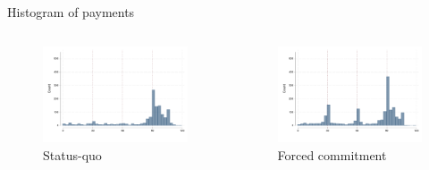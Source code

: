 \documentclass[8pt]{beamer}
\begin{document}
\begin{frame}{Histogram of payments}

\begin{columns}
\begin{column}{.33\textwidth}
    \begin{figure}[H]
    \caption{Status-quo}
    \begin{center}
        \includegraphics[width=\textwidth]{Figuras/hist_payments_sq.pdf}
    \end{center}
\end{figure}
\end{column}

\begin{column}{.33\textwidth}
    \begin{figure}[H]
    \caption{Forced commitment}
    \begin{center}
        \includegraphics[width=\textwidth]{Figuras/hist_payments_fc.pdf}
    \end{center}
\end{figure}
\end{column}


\end{columns}
\end{frame}
\end{document}
